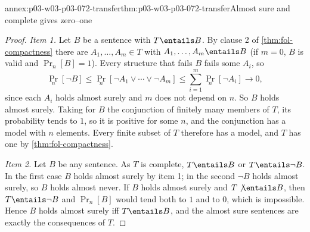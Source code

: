 \begin{annexitem}{annex:p03-w03-p03-072-transfer}{thm:p03-w03-p03-072-transfer}{Almost sure and complete gives zero--one}
\begin{proof}
\emph{Item 1.}  Let \(B\) be a sentence with \(T\entails B\).  By clause 2 of
\cref{thm:fol-compactness} there are \(A_1,\ldots,A_m\in T\) with
\(A_1,\ldots,A_m\entails B\) (if \(m=0\), \(B\) is valid and
\(\Pr_n[B]=1\)).  Every structure that fails \(B\) fails some \(A_i\), so
\[
  \Pr_n[\neg B]\leq\Pr_n[\neg A_1\lor\cdots\lor\neg A_m]
  \leq\sum_{i=1}^m\Pr_n[\neg A_i]\longrightarrow0 ,
\]
since each \(A_i\) holds almost surely and \(m\) does not depend on \(n\).  So
\(B\) holds almost surely.  Taking for \(B\) the conjunction of finitely many
members of \(T\), its probability tends to \(1\), so it is positive for some
\(n\), and the conjunction has a model with \(n\) elements.  Every finite
subset of \(T\) therefore has a model, and \(T\) has one by
\cref{thm:fol-compactness}.

\emph{Item 2.}  Let \(B\) be any sentence.  As \(T\) is complete,
\(T\entails B\) or \(T\entails\neg B\).  In the first case \(B\) holds almost
surely by item 1; in the second \(\neg B\) holds almost surely, so \(B\)
holds almost never.  If \(B\) holds almost surely and \(T\not\entails B\),
then \(T\entails\neg B\) and \(\Pr_n[B]\) would tend both to \(1\) and to
\(0\), which is impossible.  Hence \(B\) holds almost surely iff
\(T\entails B\), and the almost sure sentences are exactly the consequences
of \(T\).
\end{proof}
\end{annexitem}

